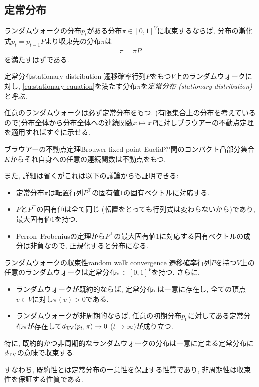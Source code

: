 \subsection{定常分布}
ランダムウォークの分布$p_t$がある分布$\pi\in[0,1]^V$に収束するならば, 分布の漸化式$p_t = p_{t-1}P$より収束先の分布$\pi$は
\begin{align}
  \pi = \pi P \label{eq:stationary equation}
\end{align}
を満たすはずである.
%
\begin{definition}{定常分布}{stationary distribution}
  遷移確率行列$P$をもつ$V$上のランダムウォークに対し, \cref{eq:stationary equation}を満たす分布$\pi$を\emph{定常分布 (stationary distribution)}と呼ぶ.
\end{definition}
%
任意のランダムウォークは必ず定常分布をもつ.
(有限集合上の分布を考えているので)分布全体から分布全体への連続関数$x \mapsto xP$に対しブラウアーの不動点定理を適用すればすぐに示せる.
\begin{theorem}{ブラウアーの不動点定理}{Brouwer fixed point}
  Euclid空間のコンパクト凸部分集合$K$からそれ自身への任意の連続関数は不動点をもつ.
\end{theorem}
また, 詳細は省くがこれは以下の議論からも証明できる:
\begin{itemize}
  \item 定常分布$\pi$は転置行列$P^{\top}$の固有値$1$の固有ベクトルに対応する.
  \item $P$と$P^\top$の固有値は全て同じ (転置をとっても行列式は変わらないから)であり, 最大固有値$1$を持つ.
  \item Perron--Frobeniusの定理から$P^\top$の最大固有値$1$に対応する固有ベクトルの成分は非負なので, 正規化すると分布になる.
\end{itemize}
%
%
\begin{theorem}{ランダムウォークの収束性}{random walk convergence}
  遷移確率行列$P$を持つ$V$上の任意のランダムウォークは定常分布$\pi \in [0,1]^V$を持つ.
  さらに,
  \begin{itemize}
    \item ランダムウォークが既約的ならば, 定常分布$\pi$は一意に存在し, 全ての頂点$v\in V$に対し$\pi(v)>0$である.
    \item ランダムウォークが非周期的ならば, 任意の初期分布$p_0$に対してある定常分布$\pi$が存在して$d_{\mathrm{TV}}(p_t,\pi)\to 0$ ($t\to\infty$)が成り立つ.
  \end{itemize}

  特に, 既約的かつ非周期的なランダムウォークの分布は一意に定まる定常分布に$d_{\mathrm{TV}}$の意味で収束する.
\end{theorem}
すなわち, 既約性とは定常分布の一意性を保証する性質であり,
非周期性は収束性を保証する性質である.

